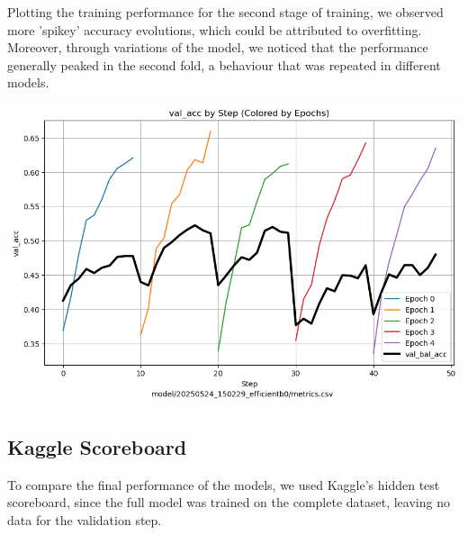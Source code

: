 \documentclass[11pt]{article}
\begin{document}
\begin{minipage}{0.65\linewidth}
  Plotting the training performance for the second stage of training, we observed more 'spikey' accuracy evolutions, which could be attributed to overfitting. Moreover, through variations of the model, we noticed that the performance generally peaked in the second fold, a behaviour that was repeated in different models.
\end{minipage}
\hfill
\begin{minipage}{0.30\linewidth}
  \includegraphics[width=\linewidth]{img/semisuper_learning_val_acc.png}
\end{minipage}

\subsection*{Kaggle Scoreboard}

To compare the final performance of the models, we used Kaggle's hidden test scoreboard, since the full model was trained on the complete dataset, leaving no data for the validation step.
\end{document}
